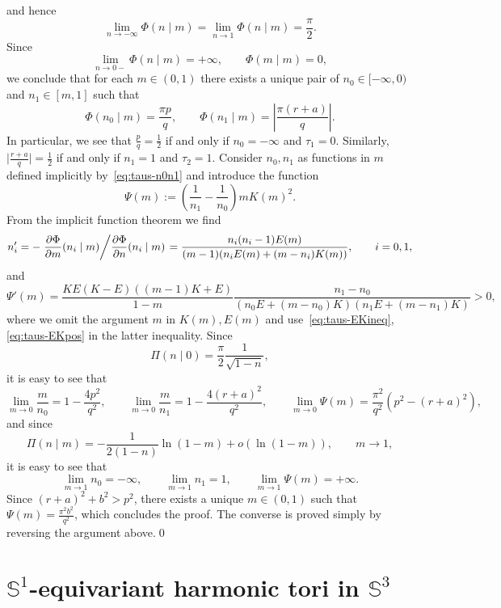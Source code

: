 \documentclass{amsart}
\theoremstyle{plain}
\theoremstyle{definition}
\theoremstyle{remark}
\begin{document}
and hence
\[
\lim_{n\to -\infty}\Phi(n\mid m)=\lim_{n\to 1}\Phi(n\mid m)=\frac{\pi}2.
\]
Since
\[
\lim_{n\to 0-}\Phi(n\mid m)=+\infty,\qquad
\Phi(m\mid m)=0,
\]
we conclude that for each \(m\in (0,1)\) there exists a unique pair of \(n_0\in
[-\infty,0)\) and \(n_1\in [m,1]\) such that
\begin{equation}\label{eq:taus-n0n1}
\Phi(n_0\mid m)=\frac{\pi p}q,\qquad
\Phi(n_1\mid m)=\left|\frac{\pi (r+a)}q\right|.
\end{equation}
In particular, we see that \(\frac{p}q=\frac{1}2\) if and only if
\(n_0=-\infty\) and \(\tau_1=0\). Similarly,
\(\bigl|\frac{r+a}q\bigr|=\frac{1}2\) if and only if \(n_1=1\) and \(\tau_2=1\).
Consider \(n_0,n_1\) as functions in \(m\) defined implicitly
by~\eqref{eq:taus-n0n1} and introduce the function
\begin{equation}\label{eq:taus-Psi}
\Psi(m):=\left(\frac{1}{n_1}-\frac{1}{n_0}\right)mK(m)^2.
\end{equation}
From the implicit function theorem we find
\begin{equation}\label{eq:taus-nprim}
n_i'=-\left.\frac{\partial\Phi}{\partial m}(n_i\mid m)\middle/
\frac{\partial\Phi}{\partial n}(n_i\mid m)\right.=
\frac{n_i(n_i-1)E(m)}{(m-1)(n_i E(m)+(m-n_i)K(m))},\qquad i=0,1,
\end{equation}
and
\[
\Psi'(m)=\frac{KE(K-E)((m-1)K+E)}{1-m}
\frac{n_1-n_0}{(n_0E+(m-n_0)K)(n_1E+(m-n_1)K)}>0,
\]
where we omit the argument \(m\) in \(K(m),E(m)\) and
use~\eqref{eq:taus-EKineq},\eqref{eq:taus-EKpos} in the latter inequality. Since
\[
\Pi(n\mid 0)=\frac{\pi}2\frac{1}{\sqrt{1-n}},
\]
it is easy to see that
\begin{equation}\label{eq:taus-limzero}
\lim_{m\to 0}\frac{m}{n_0}=1-\frac{4p^2}{q^2},\qquad
\lim_{m\to 0}\frac{m}{n_1}=1-\frac{4(r+a)^2}{q^2},\qquad
\lim_{m\to 0}\Psi(m)=\frac{\pi^2}{q^2}(p^2-(r+a)^2),
\end{equation}
and since
\[
\Pi(n\mid m)=-\frac{1}{2(1-n)}\ln(1-m)+o(\ln(1-m)),\qquad m\to 1,
\]
it is easy to see that
\begin{equation}\label{eq:taus-limone}
\lim_{m\to 1}n_0=-\infty,\qquad
\lim_{m\to 1}n_1=1,\qquad
\lim_{m\to 1}\Psi(m)=+\infty.
\end{equation}
Since \((r+a)^2+b^2>p^2\), there exists a unique \(m\in (0,1)\) such that
\(\Psi(m)=\frac{\pi^2 b^2}{q^2}\), which concludes the proof. The converse is
proved simply by reversing the argument above.\qed

\section{\texorpdfstring{\(\mathbb S^1\)}{S¹}-equivariant harmonic tori in
\texorpdfstring{\(\mathbb S^3\)}{S³}}\label{sec:harm}
\end{document}
